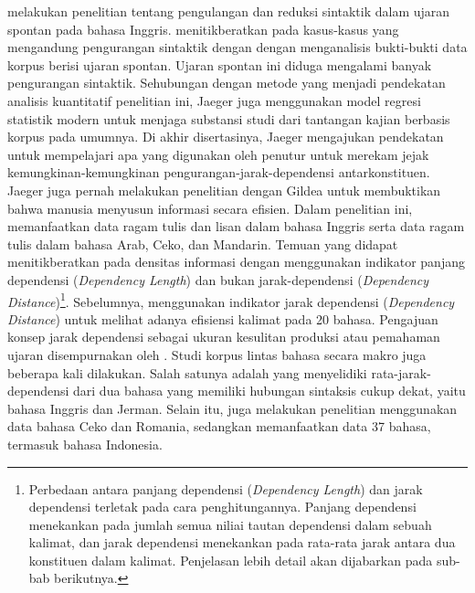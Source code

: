 \cite{jaeger2006redundancy} melakukan penelitian tentang pengulangan dan reduksi sintaktik dalam ujaran spontan pada bahasa Inggris. \cite{jaeger2006redundancy}  menitikberatkan pada kasus-kasus yang mengandung pengurangan sintaktik dengan dengan menganalisis bukti-bukti data korpus berisi ujaran spontan. Ujaran spontan ini diduga mengalami banyak pengurangan sintaktik. Sehubungan dengan metode yang menjadi pendekatan analisis kuantitatif penelitian ini, Jaeger juga menggunakan model regresi statistik modern untuk menjaga substansi studi dari tantangan kajian berbasis korpus pada umumnya. Di akhir disertasinya, Jaeger mengajukan pendekatan untuk mempelajari apa yang digunakan oleh penutur untuk merekam jejak kemungkinan-kemungkinan \gls{pengurangan-jarak-dependensi} antarkonstituen. Jaeger juga pernah melakukan penelitian dengan Gildea \citep{gildea2015human} untuk membuktikan bahwa manusia menyusun informasi secara efisien. Dalam penelitian ini, \cite{gildea2015human} memanfaatkan data ragam tulis dan lisan dalam bahasa Inggris serta data ragam tulis dalam bahasa Arab, Ceko, dan Mandarin. Temuan yang didapat menitikberatkan pada densitas informasi dengan menggunakan indikator panjang dependensi (\textit{Dependency Length}) dan bukan \gls{jarak-dependensi} (\textit{Dependency Distance})\footnote{Perbedaan antara panjang dependensi (\textit{Dependency Length}) dan jarak dependensi terletak pada cara penghitungannya. Panjang dependensi menekankan pada jumlah semua niliai tautan dependensi dalam sebuah kalimat, dan jarak dependensi menekankan pada rata-rata jarak antara dua konstituen dalam kalimat. Penjelasan lebih detail akan dijabarkan pada sub-bab berikutnya.}. Sebelumnya, \cite{liu2008dependency} menggunakan indikator jarak dependensi (\textit{Dependency Distance}) untuk melihat adanya efisiensi kalimat pada 20 bahasa. Pengajuan konsep jarak dependensi sebagai ukuran kesulitan produksi atau pemahaman ujaran disempurnakan oleh \cite{liu2017dependency}. Studi korpus lintas bahasa secara makro juga beberapa kali dilakukan. Salah satunya adalah \cite{gildea2010grammars} yang menyelidiki \gls{rata-jarak-dependensi} dari dua bahasa yang memiliki hubungan sintaksis cukup dekat, yaitu bahasa Inggris dan Jerman. Selain itu, \cite{i2004euclidean} juga melakukan penelitian menggunakan data bahasa Ceko dan Romania, sedangkan \cite{futrell2015large} memanfaatkan data 37 bahasa, termasuk bahasa Indonesia.


